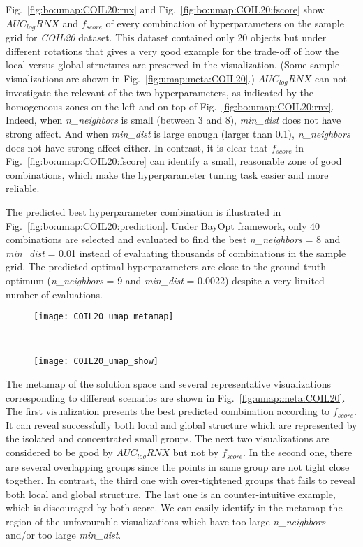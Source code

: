 Fig.~\ref{fig:bo:umap:COIL20:rnx} and Fig.~\ref{fig:bo:umap:COIL20:fscore} show $AUC_{log}RNX$ and $f_{score}$ of every combination of hyperparameters on the sample grid for \emph{COIL20} dataset.
This dataset contained only 20 objects but under different rotations that gives a very good example for the trade-off of how the local versus global structures are preserved in the visualization.
(Some sample visualizations are shown in Fig.~\ref{fig:umap:meta:COIL20}.)
$AUC_{log}RNX$ can not investigate the relevant of the two hyperparameters, as indicated by the homogeneous zones on the left and on top of Fig.~\ref{fig:bo:umap:COIL20:rnx}.
Indeed, when \emph{n\_neighbors} is small (between 3 and 8), \emph{min\_dist} does not have strong affect. And when \emph{min\_dist} is large enough (larger than 0.1), \emph{n\_neighbors} does not have strong affect either.
In contrast, it is clear that $f_{score}$ in Fig.~\ref{fig:bo:umap:COIL20:fscore} can identify a small, reasonable zone of good combinations, which make the hyperparameter tuning task easier and more reliable.

The predicted best hyperparameter combination is illustrated in Fig.~\ref{fig:bo:umap:COIL20:prediction}.
Under BayOpt framework, only 40 combinations are selected and evaluated to find the best \emph{n\_neighbors} = 8 and \emph{min\_dist} = 0.01 instead of evaluating thousands of combinations in the sample grid.
The predicted optimal hyperparameters are close to the ground truth optimum (\emph{n\_neighbors} = 9 and \emph{min\_dist} = 0.0022) despite a very limited number of evaluations.

\begin{figure*}[ht!]
    \centering
    \begin{subfigure}[b]{\linewidth}
        \centering
        \texttt{[image: COIL20\_umap\_metamap]}
    \end{subfigure}
    ~
    \begin{subfigure}[b]{\linewidth}
        \texttt{[image: COIL20\_umap\_show]}
    \end{subfigure}
    \caption{Metamaps and sample visualizations with selected hyperparameters for \emph{COIL20} dataset.}
    \label{fig:umap:meta:COIL20}
\end{figure*}

The metamap of the solution space and several representative visualizations corresponding to different scenarios are shown in Fig.~\ref{fig:umap:meta:COIL20}.
The first visualization presents the best predicted combination according to $f_{score}$.
It can reveal successfully both local and global structure which are represented by the isolated and concentrated small groups.
The next two visualizations are considered to be good by $AUC_{log}RNX$ but not by $f_{score}$.
In the second one, there are several overlapping groups since the points in same group are not tight close together.
In contrast, the third one with over-tightened groups that fails to reveal both local and global structure.
The last one is an counter-intuitive example, which is discouraged by both score.
We can easily identify in the metamap the region of the unfavourable visualizations which have too large \emph{n\_neighbors} and/or too large \emph{min\_dist}.

